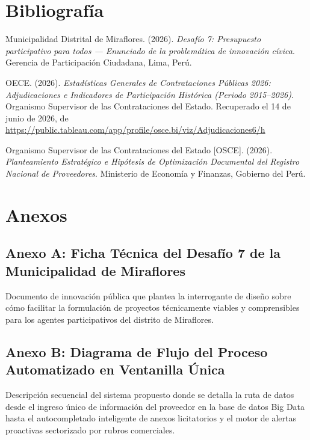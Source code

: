 \documentclass[12pt,a4paper]{article}
\newenvironment{referencias_apa}{
    \begin{flushleft}
    \setlength{\parindent}{-0.5in}
    \addtolength{\leftskip}{0.5in}
    \setlength{\parskip}{11pt}
}{\end{flushleft}}
\begin{document}
\section*{Bibliografía}

\begin{referencias_apa}
Municipalidad Distrital de Miraflores. (2026). \textit{Desafío 7: Presupuesto participativo para todos --- Enunciado de la problemática de innovación cívica}. Gerencia de Participación Ciudadana, Lima, Perú.

\vspace{0.3cm}
OECE. (2026). \textit{Estadísticas Generales de Contrataciones Públicas 2026: Adjudicaciones e Indicadores de Participación Histórica (Periodo 2015--2026)}. Organismo Supervisor de las Contrataciones del Estado. Recuperado el 14 de junio de 2026, de \url{https://public.tableau.com/app/profile/osce.bi/viz/Adjudicaciones6/h}

\vspace{0.3cm}
Organismo Supervisor de las Contrataciones del Estado [OSCE]. (2026). \textit{Planteamiento Estratégico e Hipótesis de Optimización Documental del Registro Nacional de Proveedores}. Ministerio de Economía y Finanzas, Gobierno del Perú.
\end{referencias_apa}

\newpage

\section*{Anexos}

\subsection*{Anexo A: Ficha Técnica del Desafío 7 de la Municipalidad de Miraflores}
Documento de innovación pública que plantea la interrogante de diseño sobre cómo facilitar la formulación de proyectos técnicamente viables y comprensibles para los agentes participativos del distrito de Miraflores.

\subsection*{Anexo B: Diagrama de Flujo del Proceso Automatizado en Ventanilla Única}
Descripción secuencial del sistema propuesto donde se detalla la ruta de datos desde el ingreso único de información del proveedor en la base de datos Big Data hasta el autocompletado inteligente de anexos licitatorios y el motor de alertas proactivas sectorizado por rubros comerciales.
\end{document}

